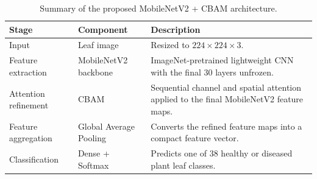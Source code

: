 \begin{table}[H]
\caption{Summary of the proposed MobileNetV2 + CBAM architecture.}
\label{tab:proposed_model_summary}
\centering
\begin{tabularx}{\textwidth}{p{3.0cm} p{4.0cm} X}
\toprule
\textbf{Stage} & \textbf{Component} & \textbf{Description} \\
\midrule
Input & Leaf image & Resized to $224 \times 224 \times 3$. \\
\addlinespace
Feature extraction & MobileNetV2 backbone & ImageNet-pretrained lightweight CNN with the final 30 layers unfrozen. \\
\addlinespace
Attention refinement & CBAM & Sequential channel and spatial attention applied to the final MobileNetV2 feature maps. \\
\addlinespace
Feature aggregation & Global Average Pooling & Converts the refined feature maps into a compact feature vector. \\
\addlinespace
Classification & Dense + Softmax & Predicts one of 38 healthy or diseased plant leaf classes. \\
\bottomrule
\end{tabularx}
\end{table}
